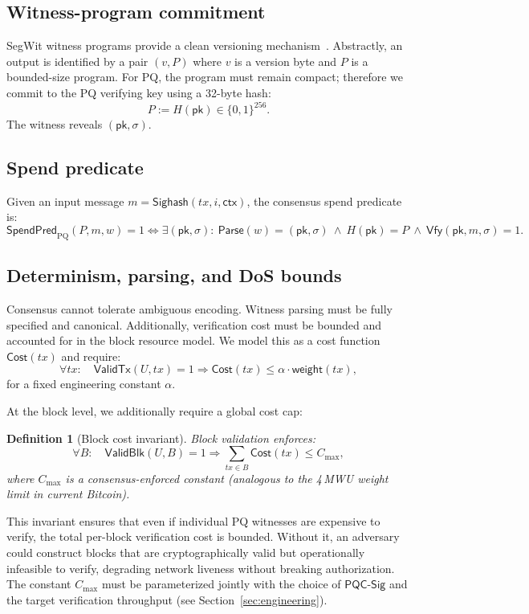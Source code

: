 \documentclass[11pt]{article}
\newtheorem{definition}{Definition}
\newcommand{\bits}{\{0,1\}}
\newcommand{\PQC}{\mathsf{PQC}}
\newcommand{\Sighash}{\mathsf{Sighash}}
\newcommand{\ValidTx}{\mathsf{ValidTx}}
\newcommand{\ValidBlk}{\mathsf{ValidBlk}}
\newcommand{\SpendPred}{\mathsf{SpendPred}}
\newcommand{\SpendPredPQ}{\SpendPred_{\mathrm{PQ}}}
\newcommand{\Cost}{\mathsf{Cost}}
\newcommand{\weight}{\mathsf{weight}}
\begin{document}
\subsection{Witness-program commitment}
SegWit witness programs provide a clean versioning mechanism~\cite{bip141}.
Abstractly, an output is identified by a pair $(v,P)$ where $v$ is a version byte and $P$ is a bounded-size program.
For PQ, the program must remain compact; therefore we commit to the PQ verifying key using a 32-byte hash:
\[
P := H(\mathsf{pk}) \in \bits^{256}.
\]
The witness reveals $(\mathsf{pk},\sigma)$.

\subsection{Spend predicate}
Given an input message $m=\Sighash(tx,i,\textsf{ctx})$, the consensus spend predicate is:
\[
\SpendPredPQ(P,m,w)=1
\iff
\exists (\mathsf{pk},\sigma):\ \textsf{Parse}(w)=(\mathsf{pk},\sigma)\ \wedge\ H(\mathsf{pk})=P\ \wedge\ \mathsf{Vfy}(\mathsf{pk},m,\sigma)=1.
\]

\subsection{Determinism, parsing, and DoS bounds}
Consensus cannot tolerate ambiguous encoding.
Witness parsing must be fully specified and canonical.
Additionally, verification cost must be bounded and accounted for in the block resource model.
We model this as a cost function $\Cost(tx)$ and require:
\[
\forall tx:\quad \ValidTx(U,tx)=1 \Rightarrow \Cost(tx) \le \alpha\cdot \weight(tx),
\]
for a fixed engineering constant $\alpha$.

At the block level, we additionally require a global cost cap:
\begin{definition}[Block cost invariant]\label{def:block-cost}
Block validation enforces:
\[
\forall B:\quad \ValidBlk(U,B)=1 \Rightarrow \sum_{tx\in B}\Cost(tx) \le C_{\max},
\]
where $C_{\max}$ is a consensus-enforced constant (analogous to the 4\,MWU weight limit in current Bitcoin).
\end{definition}

This invariant ensures that even if individual PQ witnesses are expensive to verify, the total per-block verification cost is bounded.
Without it, an adversary could construct blocks that are cryptographically valid but operationally infeasible to verify, degrading network liveness without breaking authorization.
The constant $C_{\max}$ must be parameterized jointly with the choice of $\PQC\textsf{-Sig}$ and the target verification throughput (see Section~\ref{sec:engineering}).
\end{document}

